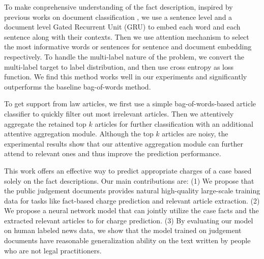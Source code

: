 To make conprehensive understanding of the fact description, inspired by previous works on document classification \cite{tang2015document,yang2016hierarchical}, we use a sentence level and a document level Gated Recurrent Unit (GRU) to embed each word and each sentence along with their contexts. 
Then we use attention mechanism to select the most informative words or sentences for sentence and document embedding respectively. 
To handle the multi-label nature of the problem, we convert the multi-label target to label distribution, and then use cross entropy as loss function. We find this method works well in our experiments and significantly outperforms the baseline bag-of-words method.

To get support from law articles, we first use a simple bag-of-words-based article classifier to quickly filter out most irrelevant articles. Then we attentively aggregate the retained top $k$ articles for further classification with an additional attentive aggregation module.
Although the top $k$ articles are noisy, the experimental results show that our attentive aggregation module can further attend to relevant ones and thus improve the prediction performance. 

This work offers an effective way to predict appropriate charges of a case based solely on the fact descriptions. Our main contributions are: (1) We propose that the public judgement documents provides natural high-quality large-scale training data for tasks like fact-based charge prediction and relevant article extraction. (2) We propose a neural network model that can jointly utilize the case facts and the extracted relevant articles to for charge prediction. (3) By evaluating our model on human labeled news data, we show that the model trained on judgement documents have reasonable generalization ability on the text written by people who are not legal practitioners. 




